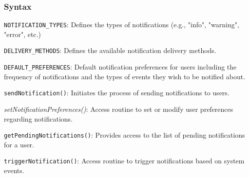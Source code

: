 \documentclass[12pt, titlepage]{article}
\begin{document}
\begin{description}
\subsubsection{Syntax}
\begin{description}
  \item[Exported Constants:] 
  \item \texttt{NOTIFICATION\_TYPES}: Defines the types of notifications (e.g., "info", "warning", "error", etc.)
  \item \texttt{DELIVERY\_METHODS}: Defines the available notification delivery methods.
  \item \texttt{DEFAULT\_PREFERENCES}: Default notification preferences for users including the 
  frequency of notifications and the types of events they wish to be notified about.
  \item 
  \item[Exported Access Programs:] 
  \item \texttt{sendNotification()}: Initiates the process of sending notifications to users.
  \item \textsl{setNotificationPreferences()}: Access routine to set or modify user preferences
  regarding notifications.
  \item \texttt{getPendingNotifications()}: Provides access to the list of pending notifications 
  for a user.
  \item \texttt{triggerNotification()}: Access routine to trigger notifications based on system 
  events.
  \item
\end{description}


\end{description}
\end{document}
